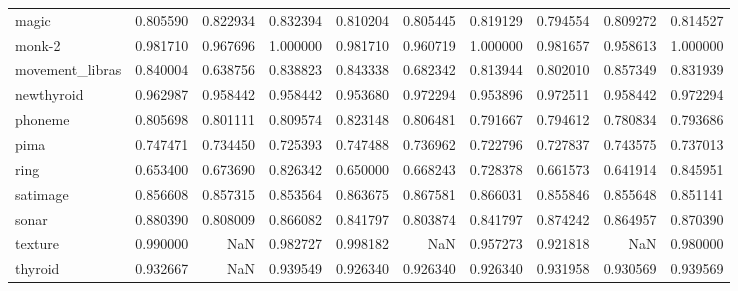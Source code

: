 \begin{tabular}{lrrrrrrrrr}
magic           &             0.805590 &             0.822934 &            0.832394 &              0.810204 &              0.805445 &             0.819129 &      0.794554 &      0.809272 &     0.814527 \\
monk-2          &             0.981710 &             0.967696 &            1.000000 &              0.981710 &              0.960719 &             1.000000 &      0.981657 &      0.958613 &     1.000000 \\
movement\_libras &             0.840004 &             0.638756 &            0.838823 &              0.843338 &              0.682342 &             0.813944 &      0.802010 &      0.857349 &     0.831939 \\
newthyroid      &             0.962987 &             0.958442 &            0.958442 &              0.953680 &              0.972294 &             0.953896 &      0.972511 &      0.958442 &     0.972294 \\
phoneme         &             0.805698 &             0.801111 &            0.809574 &              0.823148 &              0.806481 &             0.791667 &      0.794612 &      0.780834 &     0.793686 \\
pima            &             0.747471 &             0.734450 &            0.725393 &              0.747488 &              0.736962 &             0.722796 &      0.727837 &      0.743575 &     0.737013 \\
ring            &             0.653400 &             0.673690 &            0.826342 &              0.650000 &              0.668243 &             0.728378 &      0.661573 &      0.641914 &     0.845951 \\
satimage        &             0.856608 &             0.857315 &            0.853564 &              0.863675 &              0.867581 &             0.866031 &      0.855846 &      0.855648 &     0.851141 \\
sonar           &             0.880390 &             0.808009 &            0.866082 &              0.841797 &              0.803874 &             0.841797 &      0.874242 &      0.864957 &     0.870390 \\
texture         &             0.990000 &                  NaN &            0.982727 &              0.998182 &                   NaN &             0.957273 &      0.921818 &           NaN &     0.980000 \\
thyroid         &             0.932667 &                  NaN &            0.939549 &              0.926340 &              0.926340 &             0.926340 &      0.931958 &      0.930569 &     0.939569 \\

\end{tabular}
